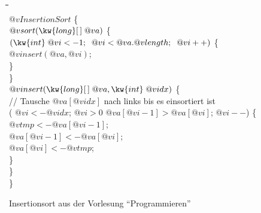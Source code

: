 \begin{algorithm}[h]
  \begin{tabbing}
    \quad\=\quad\=\quad\=\quad\=\quad\=\hspace*{30mm}\=\\[-\baselineskip] \kill
      $@v{InsertionSort}$ \{ \\
    \>    $@v{sort}(\kw{long}[\,]\; @v{a})$ \{ \\
      \>\>  $(\kw{int}\; @v{i} <- 1; \;\; @v{i} < @v{a}.@v{length};\;\;  @v{i}++)$ \{ \\
        \>\>\> $@v{insert}(@v{a}, @v{i})$; \\
        \>\> \} \\
      \> \} \\
   \>       $@v{insert}(\kw{long}[\,]\; @v{a}, \kw{int}\; @v{idx})$ \{ \\
   \>\>       /\!\!/ Tausche $@v{a}[@v{idx}]$ nach links bis es einsortiert ist \\
   \>\>        ( $@v{i} <- @v{idx}$; $@v{i} > 0$  $@v{a}[@v{i}-1] > @v{a}[@v{i}]$; $@v{i}- -$) \{    \\
   \>\>\>          $@v{tmp} <- @v{a}[@v{i} - 1]$; \\
   \>\>\>         $@v{a}[@v{i} - 1] <- @v{a}[@v{i}]$; \\
   \>\>\>         $@v{a}[@v{i}] <- @v{tmp}$; \\
   \>\>       \} \\

   \>     \} \\
   \} \\[-\baselineskip]
  \end{tabbing}
  \caption{Insertionsort aus der Vorlesung "`Programmieren"'}
  \label{alg:insertionsort}
\end{algorithm}

